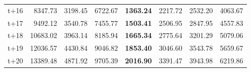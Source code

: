 \begin{table}[H]
\begin{tabular}{lrrrrrrr}
t+16  & 8347.73  & 3198.45  & 6722.67  & \textbf{1363.24}  & 2217.72  & 2532.20  & 4063.67  \\
t+17  & 9492.12  & 3540.78  & 7455.77  & \textbf{1503.41}  & 2506.95  & 2847.95  & 4557.83  \\
t+18  & 10683.02  & 3963.14  & 8185.94  & \textbf{1665.34}  & 2775.64  & 3201.29  & 5079.06  \\
t+19  & 12036.57  & 4430.84  & 9046.82  & \textbf{1853.40}  & 3046.60  & 3543.78  & 5659.67  \\
t+20  & 13389.48  & 4871.92  & 9705.39  & \textbf{2016.90}  & 3391.47  & 3943.98  & 6219.86  \\

\bottomrule
\end{tabular}
\end{table}
